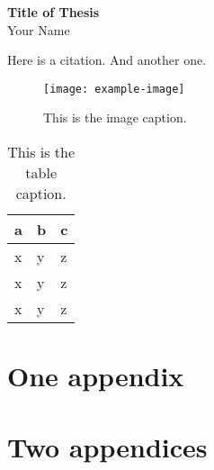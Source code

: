 \documentclass{uscf}
\begin{document}
\clearpage
\begin{centering}
  \textbf{Title of Thesis}\\
  Your Name\\
\end{centering}
\bigskip
\blindtext

\tableofcontents
\listoftables
\listoffigures

\mainmatter

\Blinddocument

\blindtext

Here is a citation\cite{einstein}.
And another one\cite{dirac}.

\blindtext

\begin{figure}\centering
  \texttt{[image: example-image]}
  \caption{This is the image caption.}
\end{figure}

\blindtext

\begin{table}\centering
  \begin{tabular}{lll}\toprule
    a & b & c \\\midrule
    x & y & z \\
    x & y & z \\
    x & y & z \\\bottomrule
  \end{tabular}
  \caption{This is the table caption.}
\end{table}


\printbibliography[heading=bibintoc]

\appendix

\chapter{One appendix}

\blindtext

\chapter{Two appendices}

\blindtext

\clearpage
\end{document}
